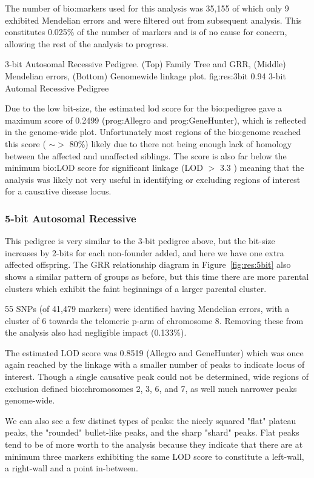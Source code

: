 The number of \gls{bio:markers} used for this analysis was 35,155 of which only 9 exhibited Mendelian errors and were filtered out from subsequent analysis. This constitutes 0.025\% of the number of markers and is of no cause for concern, allowing the rest of the analysis to progress.

{3-bit Autosomal Recessive Pedigree. (Top) Family Tree and GRR, (Middle) Mendelian errors, (Bottom) Genomewide linkage plot.}
{fig:res:3bit}
{0.94}
{3-bit Automal Recessive Pedigree}

Due to the low bit-size, the estimated lod score for the \gls{bio:pedigree} gave a maximum score of 0.2499 (\gls{prog:Allegro} and \gls{prog:GeneHunter}), which is reflected in the genome-wide plot. Unfortunately most regions of the \gls{bio:genome} reached this score ( $\sim>$ 80\%) likely due to there not being enough lack of homology between the affected and unaffected siblings. The score is also far below the minimum \gls{bio:LOD} score for significant linkage (LOD $>$ 3.3 \cite{center1995genetic}) meaning that the analysis was likely not very useful in identifying or excluding regions of interest for a causative disease locus.

\subsubsection*{5-bit Autosomal Recessive}

This pedigree is very similar to the 3-bit pedigree above, but the bit-size increases by 2-bits for each non-founder added, and here we have one extra affected offspring. The GRR relationship diagram in Figure~\ref{fig:res:5bit} also shows a similar pattern of groups as before, but this time there are more parental clusters which exhibit the faint beginnings of a larger parental cluster. 

55 SNPs (of 41,479 markers) were identified having Mendelian errors, with a cluster of 6 towards the telomeric p-arm of chromosome 8. Removing these from the analysis also had negligible impact (0.133\%).

The estimated LOD score was 0.8519 (Allegro and GeneHunter) which was once again reached by the linkage with a smaller number of peaks to indicate locus of interest. Though a single causative peak could not be determined, wide regions of exclusion defined \gls{bio:chromosomes} 2, 3, 6, and 7, as well much narrower peaks genome-wide.

We can also see a few distinct types of peaks: the nicely squared "flat" plateau peaks, the "rounded" bullet-like peaks, and the sharp "shard" peaks. Flat peaks tend to be of more worth to the analysis because they indicate that there are at minimum three markers exhibiting the same LOD score to constitute a left-wall, a right-wall and a point in-between. 

